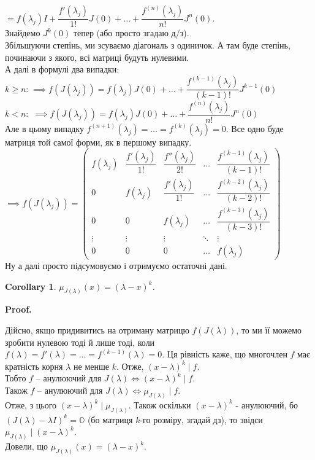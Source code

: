 \documentclass[a4paper, 10pt]{article}
\makeatletter
\theoremstyle{theoremdd}
\newtheorem{corollary}[theorem]{Corollary}
\renewenvironment{proof}[1][Proof.\\]{\par
\pushQED{\hfill \qed}%
\normalfont \topsep6\p@\@plus6\p@\relax
\trivlist
\item\relax
{\bfseries
#1\@addpunct{.}}\hspace\labelsep\ignorespaces
}{%
\popQED\endtrivlist\@endpefalse
}
\makeatother
\begin{document}
$\boxed{=} f(\lambda_j)I + \dfrac{f'(\lambda_j)}{1!}J(0) + \dots + \dfrac{f^{(n)}(\lambda_j)}{n!}J^n(0)$.\\
Знайдемо $J^k(0)$ тепер (або просто згадаю д/з).\\
Збільшуючи степінь, ми зсуваємо діагональ з одиничок. А там буде степінь, починаючи з якого, всі матриці будуть нулевими.\\
А далі в формулі два випадки:\\
$k \geq n$:
$\implies f(J(\lambda_j)) = f(\lambda_j)J(0) + \dots + \dfrac{f^{(k-1)}(\lambda_j)}{(k-1)!}J^{k-1}(0)$\\
$k < n:$
$\implies f(J(\lambda_j)) = f(\lambda_j)J(0) + \dots + \dfrac{f^{(n)}(\lambda_j)}{n!}J^{n}(0)$\\
Але в цьому випадку $f^{(n+1)}(\lambda_j) = \dots = f^{(k)}(\lambda_j) = 0$. Все одно буде матриця той самої форми, як в першому випадку.\\
$\implies f(J(\lambda_j)) = \begin{pmatrix}
 f(\lambda_j) & \dfrac{f'(\lambda_j)}{1!} & \dfrac{f''(\lambda_j)}{2!} & \dots & \dfrac{f^{(k-1)}(\lambda_j)}{(k-1)!} \\
 0 & f(\lambda_j) & \dfrac{f'(\lambda_j)}{1!} & \dots & \dfrac{f^{(k-2)}(\lambda_j)}{(k-2)!} \\
 0 & 0 & f(\lambda_j) & \dots & \dfrac{f^{(k-3)}(\lambda_j)}{(k-3)!} \\
 \vdots & \vdots & \vdots & \ddots & \vdots \\
 0 & 0 & 0 & \dots & f(\lambda_j) 
\end{pmatrix}$\\
Ну а далі просто підсумовуємо і отримуємо остаточні дані.

\begin{corollary}
$\mu_{J(\lambda)}(x) = (\lambda-x)^k$.
\end{corollary}

\begin{proof}
Дійсно, якщо придивитись на отриману матрицю $f(J(\lambda))$, то ми її можемо зробити нулевою тоді й лише тоді, коли $f(\lambda) = f'(\lambda) = \dots = f^{(k-1)}(\lambda) = 0$. Ця рівність каже, що многочлен $f$ має кратність корня $\lambda$ не менше $k$. Отже, $(x-\lambda)^k \mid f$.\\
Тобто $f$ -- анулюючий для $J(\lambda) \iff (x-\lambda)^k \mid f$.\\
Також $f$ -- анулюючий для $J(\lambda) \iff \mu_{J(\lambda)} \mid f$.\\
Отже, з цього $(x-\lambda)^k \mid \mu_{J(\lambda)}$. Також оскільки $(x-\lambda)^k$ - анулюючий, бо $(J(\lambda) - \lambda I)^k = \mathbb{O}$ (бо матриця $k$-го розміру, згадай дз), то звідси $\mu_{J(\lambda)} \mid (x-\lambda)^k$.\\
Довели, що $\mu_{J(\lambda)}(x) = (\lambda-x)^k$.
\end{proof}
\end{document}
